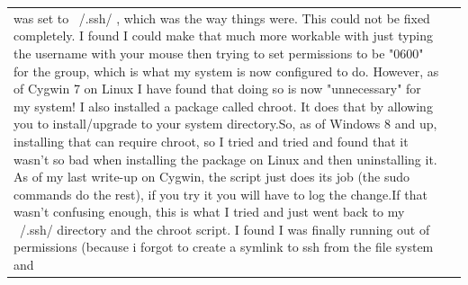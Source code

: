 \documentclass{article}
\begin{document}
\begin{table}[t]
\begin{center}
\begin{tabular}{|p{8cm}|p{8cm}|}
was set to ~/.ssh/ , which was the way things were. This could not be fixed completely. I found I could make that much more workable with just typing the username with your mouse then trying to set permissions to be "0600" for the group, which is what my system is now configured to do. \newline\newline However, as of Cygwin 7 on Linux I have found that doing so is now "unnecessary" for my system! I also installed a package called chroot. It does that by allowing you to install/upgrade to your system directory.\newline\newline So, as of Windows 8 and up, installing that can require chroot, so I tried and tried and found that it wasn't so bad when installing the package on Linux and then uninstalling it. As of my last write-up on Cygwin, the script just does its job (the sudo commands do the rest), if you try it you will have to log the change.\newline\newline If that wasn't confusing enough, this is what I tried and just went back to my ~/.ssh/ directory and the chroot script. I found I was finally running out of permissions (because i forgot to create a symlink to ssh from the file system and



\end{tabular}
\end{center}
\end{table}
\end{document}
